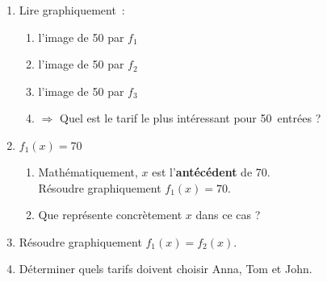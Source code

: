 \begin{enumerate}[1)~~~]

\item Lire graphiquement~:
		\begin{enumerate}
			\item l'image de 50 par $f_1~$	%
			\item l'image de 50 par $f_2~$	%
			\item l'image de 50 par $f_3~$	%
			\item $\Longrightarrow$ Quel est le tarif le plus intéressant pour 50~entrées ?	%
		\end{enumerate}


\newpage

\item $f_1(x)=70$
		\begin{enumerate}
			\item Mathématiquement, $x$ est l'\textbf{antécédent} de 70.\\ Résoudre graphiquement $f_1(x)=70$.	%
			\item Que représente concrètement $x$ dans ce cas ?
		\end{enumerate}
		

\item Résoudre graphiquement $f_1(x)=f_2(x)$.	%


\item Déterminer quels tarifs doivent choisir Anna, Tom et John.	%


\end{enumerate}

